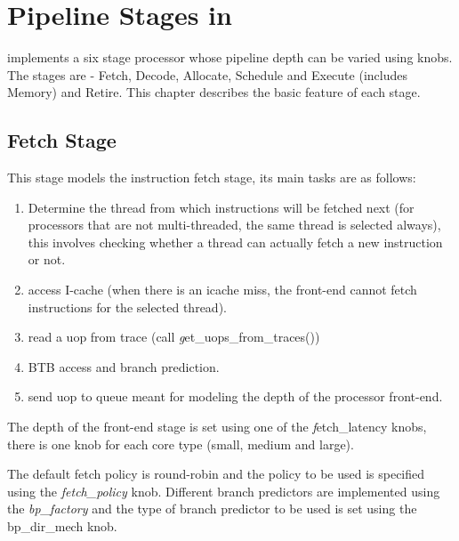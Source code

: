 


\chapter{Pipeline Stages in \SIM}

\SIM implements a six stage processor whose pipeline depth can be varied using
knobs. The stages are - Fetch, Decode, Allocate, Schedule and Execute (includes
    Memory) and Retire. This chapter describes the basic feature of each
stage.

\section{Fetch Stage}
This stage models the instruction fetch stage, its main tasks
are as follows:

\begin{enumerate}

\item Determine the thread from which instructions will be fetched next (for
    processors that are not multi-threaded, the same thread is selected
    always), this involves checking whether a thread can actually fetch a new
instruction or not.


\item access I-cache (when there is an icache miss, the front-end cannot fetch
    instructions for the selected thread).

\item read a uop from trace (call {\textit get\_uops\_from\_traces()})

\item BTB access and branch prediction. 

\item send uop to queue meant for modeling the depth of the processor front-end.

\end{enumerate}

The depth of the front-end stage is set using one of the {\textit
  fetch\_latency} knobs, there is one knob for each core type (small, medium
      and large).
   The default fetch policy is
    round-robin and the policy to be used is specified using the
    \textit{fetch\_policy} knob.  Different branch predictors are
      implemented using the \textit{bp\_factory} and the type of branch
      predictor to be used is set using the bp\_dir\_mech knob.

